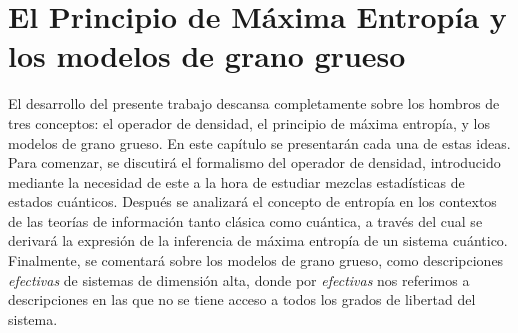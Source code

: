\chapter{El Principio de Máxima Entropía y los modelos de grano grueso}
\label{ch:2}

El desarrollo del presente trabajo descansa completamente sobre los hombros de tres conceptos: el operador de densidad, el principio de máxima entropía, y los modelos de grano grueso. En este capítulo se presentarán cada una de estas ideas. Para comenzar, se discutirá el formalismo del operador de densidad, introducido mediante la necesidad de este a la hora de estudiar mezclas estadísticas de estados cuánticos. Después se analizará el concepto de entropía en los contextos de las teorías de información tanto clásica como cuántica, a través del cual se derivará la expresión de la inferencia de máxima entropía de un sistema cuántico. Finalmente, se comentará sobre los modelos de grano grueso, como descripciones \textit{efectivas} de sistemas de dimensión alta, donde por \textit{efectivas} nos referimos a descripciones en las que no se tiene acceso a todos los grados de libertad del sistema.






\newpage